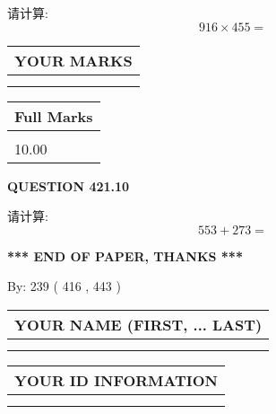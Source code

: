 \documentclass{ctexart}
\begin{document}
  
 
请计算:
\begin{equation}
916  \times    %
455 = \nonumber
\end{equation}
 

 

 
  
\vspace{0.2in}
  
\noindent\begin{tabular}{|l|}
\hline
 YOUR MARKS  \\
\hline
 \\ 
 \\ 
\hline
\end{tabular}
\hspace{0.05in} \begin{tabular}{|l|}
\hline
 Full Marks  \\
\hline
 \\ 
10.00 \\
\hline
\end{tabular}
{\textbf{\Large{QUESTION
421.10 
}}}
  
  
 
请计算:
\begin{equation}
553 +  %
273 = \nonumber
\end{equation}
 

 

 
   
   
 \vspace{0.2in}
 
   
   
   
   
\vspace{1.0in} 
{\textbf{\large{ *** END OF PAPER, THANKS *** }}} 
   
   
\hspace{1.0in} By: 
 239 ( 416 ,  443 )
   
   
   
   
\newpage 
\setcounter{page}{ 
   422001 } 
   
   
   
   
\noindent\begin{tabular}{|l|}
\hline
YOUR NAME (FIRST, ... LAST)  \\
\hline
 \\ 
 \\ 
\hline
\end{tabular}
\hspace{0.05in} \begin{tabular}{|l|}
\hline
 YOUR   ID   INFORMATION  \\
\hline
 \\ 
 \\ 
\hline
\end{tabular}
   
\end{document}
